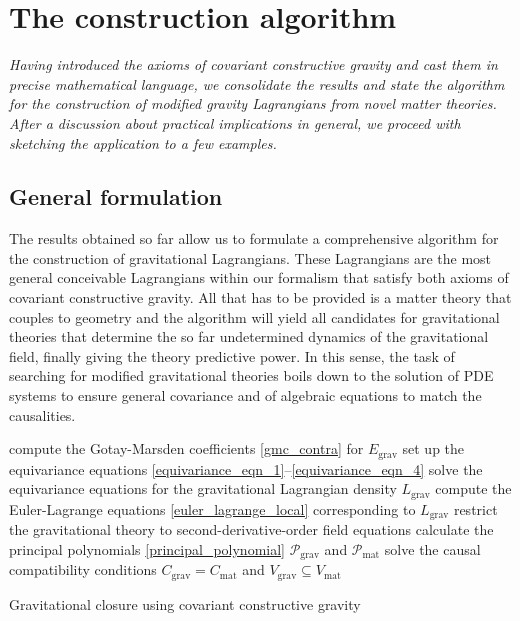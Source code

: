 \chapter{The construction algorithm}
\label{chapter_construction_algorithm}

\textit{Having introduced the axioms of covariant constructive gravity and cast them in precise mathematical language, we consolidate the results and state the algorithm for the construction of modified gravity Lagrangians from novel matter theories. After a discussion about practical implications in general, we proceed with sketching the application to a few examples.}

\section{General formulation}

The results obtained so far allow us to formulate a comprehensive algorithm for the construction of gravitational Lagrangians. These Lagrangians are the most general conceivable Lagrangians within our formalism that satisfy both axioms of covariant constructive gravity. All that has to be provided is a matter theory that couples to geometry and the algorithm will yield all candidates for gravitational theories that determine the so far undetermined dynamics of the gravitational field, finally giving the theory predictive power. In this sense, the task of searching for modified gravitational theories boils down to the solution of PDE systems to ensure general covariance and of algebraic equations to match the causalities.

\begin{algorithm}[H]\label{algorithm}
  \DontPrintSemicolon
  compute the Gotay-Marsden coefficients \eqref{gmc_contra} for $E_\text{grav}$ \;
  set up the equivariance equations \eqref{equivariance_eqn_1}--\eqref{equivariance_eqn_4} \;
  solve the equivariance equations for the gravitational Lagrangian density $L_\text{grav}$ \;
  compute the Euler-Lagrange equations \eqref{euler_lagrange_local} corresponding to $L_\text{grav}$ \;
  restrict the gravitational theory to second-derivative-order field equations \;
  calculate the principal polynomials \eqref{principal_polynomial} $\mathcal P_\text{grav}$ and $\mathcal P_\text{mat}$ \;
  solve the causal compatibility conditions $C_\text{grav} = C_\text{mat}$ and $V_\text{grav} \subseteq V_\text{mat}$
  \caption{Gravitational closure using covariant constructive gravity}
\end{algorithm}

